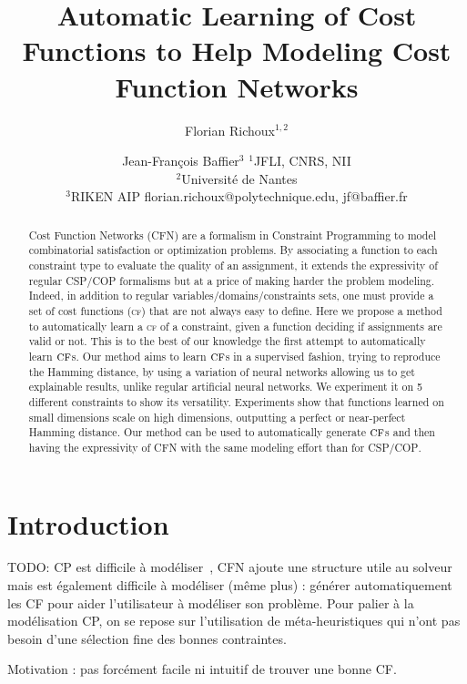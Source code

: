 \documentclass{article}
\title{Automatic Learning of Cost Functions to Help Modeling Cost Function Networks}
\author{
Florian Richoux$^{1,2}$
\and
Jean-François Baffier$^3$
\affiliations
$^1$JFLI, CNRS, NII\\
$^2$Université de Nantes\\
$^3$RIKEN AIP
\emails
florian.richoux@polytechnique.edu,
jf@baffier.fr
}
\newcommand{\csp}{\textsc{CSP}\xspace}
\newcommand{\cop}{\textsc{COP}\xspace}
\newcommand{\cfn}{\textsc{CFN}\xspace}
\newcommand{\cf}{\textsc{cf}\xspace}
\begin{document}
\maketitle

\begin{abstract}
  Cost  Function  Networks  (\cfn)   are  a  formalism  in  Constraint
  Programming  to  model  combinatorial satisfaction  or  optimization
  problems.   By associating  a function  to each  constraint type  to
  evaluate the quality  of an assignment, it  extends the expressivity
  of regular \csp/\cop formalisms but at  a price of making harder the
  problem    modeling.     Indeed,     in    addition    to    regular
  variables/domains/constraints sets,  one must provide a  set of cost
  functions (\cf) that are not always easy to define.  Here we propose
  a  method to  automatically learn  a \cf  of a  constraint, given  a
  function deciding if  assignments are valid or not.  This  is to the
  best  of our  knowledge  the first  attempt  to automatically  learn
  $\cf$s.  Our  method aims to  learn $\cf$s in a  supervised fashion,
  trying to  reproduce the Hamming  distance, by using a  variation of
  neural  networks  allowing us  to  get  explainable results,  unlike
  regular artificial neural networks.  We experiment it on 5 different
  constraints  to   show  its  versatility.   Experiments   show  that
  functions  learned on  small  dimensions scale  on high  dimensions,
  outputting a  perfect or near-perfect Hamming  distance.  Our method
  can be  used to  automatically generate $\cf$s  and then  having the
  expressivity  of  \cfn  with  the  same  modeling  effort  than  for
  \csp/\cop.
\end{abstract}

\section{Introduction}\label{sec:introduction}

TODO: CP  est difficile à  modéliser~\cite{Puget2004,Wallace2003}, CFN
ajoute une structure  utile au solveur mais est  également difficile à
modéliser  (même plus)  : générer  automatiquement les  CF pour  aider
l'utilisateur à modéliser son problème.  Pour palier à la modélisation
CP, on se repose sur  l'utilisation de méta-heuristiques qui n'ont pas
besoin       d'une        sélection       fine        des       bonnes
contraintes. \cite{AMJFH2011,Bessiere2015,CBLS}

Motivation : pas forcément facile ni intuitif de trouver une bonne CF.
\end{document}
